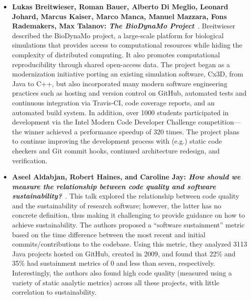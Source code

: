 \documentclass[11pt, oneside]{amsart}
\begin{document}
\begin{itemize}[itemsep=1ex]
    \item \textbf{Lukas Breitwieser\textsuperscript{\textasteriskcentered},
    Roman Bauer, Alberto Di Meglio, Leonard Johard,
    Marcus Kaiser, Marco Manca, Manuel Mazzara, Fons Rademakers,
    Max Talanov: \textit{The BioDynaMo Project}}~\cite{Bauer:2016ws}.
    Breitwieser described the BioDynaMo project, a large-scale platform for
    biological simulations that provides access to computational resources while
    hiding the complexity of distributed computing. It also promotes computational
    reproducibility through shared open-access data. The project began as a
    modernization initiative porting an existing simulation software, Cx3D, from
    Java to C++, but also incorporated many modern software engineering practices
    such as hosting and version control on GitHub, automated tests and continuous
    integration via Travis-CI, code coverage reports, and an automated build system.
    In addition, over 1000 students participated in development via the Intel
    Modern Code Developer Challenge competition---the winner achieved a
    performance speedup of 320 times. The project plans to continue improving
    the development process with (e.g.) static code checkers and Git commit hooks,
    continued architecture redesign, and verification.

    \item \textbf{Aseel Aldabjan, Robert Haines, and
    Caroline Jay\textsuperscript{\textasteriskcentered}: \textit{How should we
    measure the relationship between code quality and software
    sustainability?}}~\cite{Aldabjan:2016ws}.
    This talk explored the relationship between code quality and the sustainability
    of research software; however, the latter has no concrete definition, thus making
    it challenging to provide guidance on how to achieve sustainability. The authors
    proposed a ``software sustainment'' metric based on the time difference between
    the most recent and initial commits\slash contributions to the codebase.
    Using this metric, they analyzed 3113 Java projects hosted on GitHub, created
    in 2009, and found that 22\% and 35\% had sustainment metrics of 0 and less
    than seven, respectively. Interestingly, the authors also found high
    code quality (measured using a variety of static analytic metrics) across
    all these projects, with little correlation to sustainability.


\end{itemize}

\end{document}
